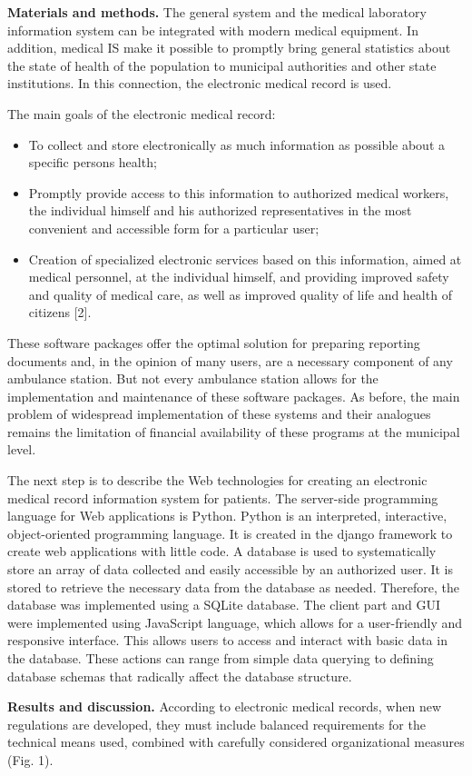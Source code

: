 \begin{multicols}{2}
{\bfseries Materials and methods.} The general system and the medical
laboratory information system can be integrated with modern medical
equipment. In addition, medical IS make it possible to promptly bring
general statistics about the state of health of the population to
municipal authorities and other state institutions. In this connection,
the electronic medical record is used.

The main goals of the electronic medical record:

\begin{itemize}
\item
  To collect and store electronically as much information as possible
  about a specific person\textquotesingle s health;
\item
  Promptly provide access to this information to authorized medical
  workers, the individual himself and his authorized representatives in
  the most convenient and accessible form for a particular user;
\item
  Creation of specialized electronic services based on this information,
  aimed at medical personnel, at the individual himself, and providing
  improved safety and quality of medical care, as well as improved
  quality of life and health of citizens {[}2{]}.
\end{itemize}

These software packages offer the optimal solution for preparing
reporting documents and, in the opinion of many users, are a necessary
component of any ambulance station. But not every ambulance station
allows for the implementation and maintenance of these software
packages. As before, the main problem of widespread implementation of
these systems and their analogues remains the limitation of financial
availability of these programs at the municipal level.

The next step is to describe the Web technologies for creating an
electronic medical record information system for patients. The
server-side programming language for Web applications is Python. Python
is an interpreted, interactive, object-oriented programming language. It
is created in the django framework to create web applications with
little code. A database is used to systematically store an array of data
collected and easily accessible by an authorized user. It is stored to
retrieve the necessary data from the database as needed. Therefore, the
database was implemented using a SQLite database. The client part and
GUI were implemented using JavaScript language, which allows for a
user-friendly and responsive interface. This allows users to access and
interact with basic data in the database. These actions can range from
simple data querying to defining database schemas that radically affect
the database structure.

{\bfseries Results and discussion.} According to electronic medical
records, when new regulations are developed, they must include balanced
requirements for the technical means used, combined with carefully
considered organizational measures (Fig. 1).

\end{multicols}

